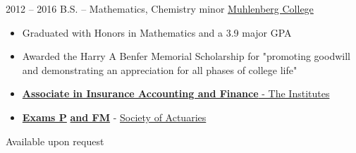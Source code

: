 \documentclass[9pt]{developercv} %
\begin{document}

\vspace{-0.5cm}


\begin{entrylist}
	\entry
		{\small2012 -- 2016}
		{B.S. -- Mathematics, Chemistry minor}
		{\href{https://www.muhlenberg.edu/}{Muhlenberg College}}
		{\vspace{-18pt}
			\begin{itemize}[leftmargin=*]
				\setlength{\itemsep}{0pt}
				\setlength{\parskip}{0pt}
				\setlength{\parsep}{0pt}
				\item Graduated with Honors in Mathematics and a 3.9 major GPA
				\item Awarded the Harry A Benfer Memorial Scholarship for "promoting goodwill and demonstrating an appreciation for all phases of college life"
		\end{itemize}}
\end{entrylist}


\begin{minipage}[t]{0.46\textwidth}
	\vspace{-\baselineskip} %

	\vspace{-10pt}
	\begin{itemize}[leftmargin=*]
		\setlength{\itemsep}{0pt}
		\setlength{\parskip}{0pt}
		\setlength{\parsep}{0pt}
		\item\href{https://web.theinstitutes.org/designations/associate-insurance-accounting-and-finance}{\textbf{Associate in Insurance Accounting and Finance} - The Institutes}
		\item\href{https://www.soa.org/education/exam-req/edu-exam-p-detail/}{\textbf{Exams P}} \href{https://www.soa.org/education/exam-req/edu-exam-fm-detail/}{\textbf{and FM}} - \href{https://www.soa.org/}{Society of Actuaries}
	\end{itemize}
\end{minipage}
\hspace{0.5cm}
\begin{minipage}[t]{0.46\textwidth}
	\vspace{-\baselineskip} %
	
	\vspace{-4pt}
	
	Available upon request
\end{minipage}

\end{document}
